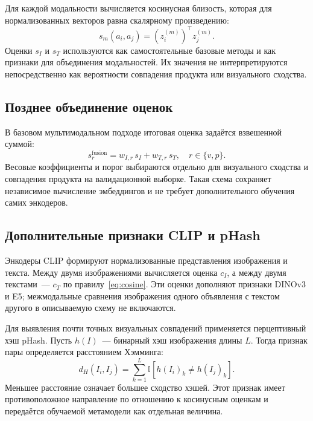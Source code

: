 \documentclass{misisarticle}
\begin{document}
Для каждой модальности вычисляется косинусная близость, которая для нормализованных векторов равна скалярному произведению:
\begin{equation}
  s_m(a_i,a_j)=\left(z_i^{(m)}\right)^{\top}z_j^{(m)}.
  \label{eq:cosine}
\end{equation}
Оценки $s_I$ и $s_T$ используются как самостоятельные базовые методы и как признаки для объединения модальностей. Их значения не интерпретируются непосредственно как вероятности совпадения продукта или визуального сходства.

\subsection{Позднее объединение оценок}

В базовом мультимодальном подходе итоговая оценка задаётся взвешенной суммой:
\begin{equation}
  s_r^{\mathrm{fusion}}=
  w_{I,r}\,s_I+w_{T,r}\,s_T,
  \quad r\in\{v,p\}.
  \label{eq:fusion}
\end{equation}
Весовые коэффициенты и порог выбираются отдельно для визуального сходства и совпадения продукта на валидационной выборке. Такая схема сохраняет независимое вычисление эмбеддингов и не требует дополнительного обучения самих энкодеров.

\subsection{Дополнительные признаки CLIP и pHash}

Энкодеры CLIP формируют нормализованные представления изображения и текста. Между двумя изображениями вычисляется оценка $c_I$, а между двумя текстами~--- $c_T$ по правилу~\eqref{eq:cosine}. Эти оценки дополняют признаки DINOv3 и E5; межмодальные сравнения изображения одного объявления с текстом другого в описываемую схему не включаются.

Для выявления почти точных визуальных совпадений применяется перцептивный хэш pHash. Пусть $h(I)$~--- бинарный хэш изображения длины $L$. Тогда признак пары определяется расстоянием Хэмминга:
\begin{equation}
  d_H(I_i,I_j)=\sum_{k=1}^{L}
  \mathbb{I}\!\left[h(I_i)_k\neq h(I_j)_k\right].
  \label{eq:phash}
\end{equation}
Меньшее расстояние означает большее сходство хэшей. Этот признак имеет противоположное направление по отношению к косинусным оценкам и передаётся обучаемой метамодели как отдельная величина.
\end{document}

